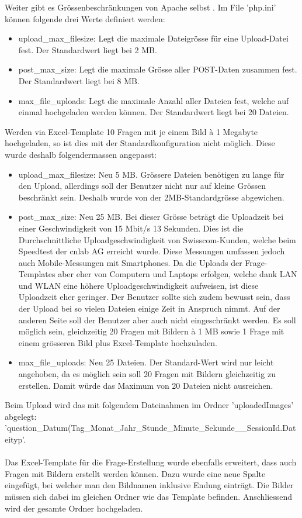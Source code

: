 Weiter gibt es Grössenbeschränkungen von Apache selbst \cite{stackoverflow_largeFilePHP}. Im File 'php.ini' können folgende drei Werte definiert werden:
\begin{itemize}
	\item upload\_max\_filesize: Legt die maximale Dateigrösse für eine Upload-Datei fest. Der Standardwert liegt bei 2 MB.
	\item post\_max\_size: Legt die maximale Grösse aller POST-Daten zusammen fest. Der Standardwert liegt bei 8 MB.
	\item max\_file\_uploads: Legt die maximale Anzahl aller Dateien fest, welche auf einmal hochgeladen werden können. Der Standardwert liegt bei 20 Dateien.
\end{itemize}

Werden via Excel-Template 10 Fragen mit je einem Bild à 1 Megabyte hochgeladen, so ist dies mit der Standardkonfiguration nicht möglich. Diese wurde deshalb folgendermassen angepasst:
\begin{itemize}
	\item upload\_max\_filesize: Neu 5 MB. Grössere Dateien benötigen zu lange für den Upload, allerdings soll der Benutzer nicht nur auf kleine Grössen beschränkt sein. Deshalb wurde von der 2MB-Standardgrösse abgewichen.
	\item post\_max\_size: Neu 25 MB. Bei dieser Grösse beträgt die Uploadzeit bei einer Geschwindigkeit von 15 Mbit/s 13 Sekunden. Dies ist die Durchschnittliche Uploadgeschwindigkeit von Swisscom-Kunden, welche beim Speedtest der cnlab AG \cite{cnlab_speedtest} erreicht wurde. Diese Messungen umfassen jedoch auch Mobile-Messungen mit Smartphones. Da die Uploads der Frage-Templates aber eher von Computern und Laptops erfolgen, welche dank LAN und WLAN eine höhere Uploadgeschwindigkeit aufweisen, ist diese Uploadzeit eher geringer. Der Benutzer sollte sich zudem bewusst sein, dass der Upload bei so vielen Dateien einige Zeit in Anspruch nimmt.
	Auf der anderen Seite soll der Benutzer aber auch nicht eingeschränkt werden. Es soll möglich sein, gleichzeitig 20 Fragen mit Bildern à 1 MB sowie 1 Frage mit einem grösseren Bild plus Excel-Template hochzuladen.
	\item max\_file\_uploads: Neu 25 Dateien. Der Standard-Wert wird nur leicht angehoben, da es möglich sein soll 20 Fragen mit Bildern gleichzeitig zu erstellen. Damit würde das Maximum von 20 Dateien nicht ausreichen.
\end{itemize}

Beim Upload wird das mit folgendem Dateinahmen im Ordner 'uploadedImages' abgelegt: 'question\_Datum(Tag\_Monat\_Jahr\_Stunde\_Minute\_Sekunde\_\_SessionId.Dateityp'.
\\
\\
Das Excel-Template für die Frage-Erstellung wurde ebenfalls erweitert, dass auch Fragen mit Bildern erstellt werden können. Dazu wurde eine neue Spalte eingefügt, bei welcher man den Bildnamen inklusive Endung einträgt. Die Bilder müssen sich dabei im gleichen Ordner wie das Template befinden. Anschliessend wird der gesamte Ordner hochgeladen.

